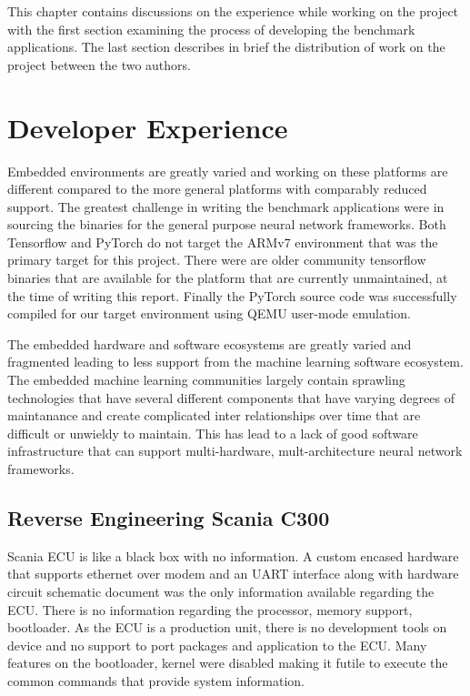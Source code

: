 This chapter contains discussions on the experience while working on the project with the first section examining the process of developing the benchmark applications. The last section describes in brief the distribution of work on the project between the two authors.

\section{Developer Experience}

Embedded environments are greatly varied and working on these platforms are different compared to the more general platforms with comparably reduced support. The greatest challenge in writing the benchmark applications were in sourcing the binaries for the general purpose neural network frameworks. Both Tensorflow and PyTorch do not target the ARMv7 environment that was the primary target for this project. There were are older community tensorflow binaries that are available for the platform that are currently unmaintained, at the time of writing this report. Finally the PyTorch source code was successfully compiled for our target environment using QEMU user-mode emulation.

The embedded hardware and software ecosystems are greatly varied and fragmented leading to less support from the machine learning software ecosystem. The embedded machine learning communities largely contain sprawling technologies that have several different components that have varying degrees of maintanance and create complicated inter relationships over time that are difficult or unwieldy to maintain. This has lead to a lack of good software infrastructure that can support multi-hardware, mult-architecture neural network frameworks.

\subsection{Reverse Engineering Scania C300}

Scania ECU is like a black box with no information. A custom encased hardware that supports ethernet over modem and an UART interface along with hardware circuit schematic document was the only information available regarding the ECU. There is no information regarding the processor,  memory support, bootloader. As the ECU is a production unit, there is no development tools on device and no support to port packages and application to the ECU. Many features on the bootloader, kernel were disabled making it futile to execute the common commands that provide system information.

